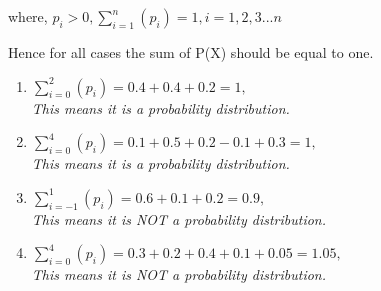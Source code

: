 \documentclass[journal,12pt,twocolumn]{IEEEtran}
\begin{document}
	where, \(p_i>0, \sum_{i=1}^{n}(p_i) =1, i=1,2,3...n\)
  

\parindent6pt Hence for all cases the sum of P(X) should be equal to one.
\begin{enumerate}

	\item \(\sum_{i=0}^{2}(p_i) =0.4+0.4+0.2= 1,\) \\
  \emph{This means it is a probability distribution.}

   \item \(\sum_{i=0}^{4}(p_i) =0.1+0.5+0.2-0.1+0.3= 1,\) \\
  \emph{This means it is a probability distribution.}
  
   \item \(\sum_{i=-1}^{1}(p_i) =0.6+0.1+0.2= 0.9,\) \\
  \emph{This means it is NOT a probability distribution.}
  
   \item \(\sum_{i=0}^{4}(p_i) =0.3+0.2+0.4+0.1+0.05= 1.05,\) \\
  \emph{This means it is NOT a probability distribution.}
  
\end{enumerate}
\end{document}
